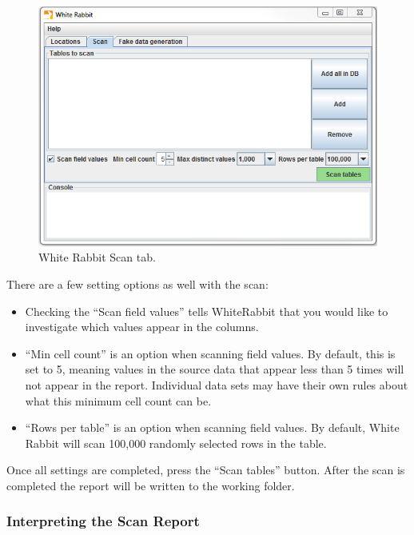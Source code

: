 \documentclass[11pt]{book}
\providecommand{\tightlist}{%
  \setlength{\itemsep}{0pt}\setlength{\parskip}{0pt}}
\theoremstyle{definition}
\theoremstyle{definition}
\theoremstyle{definition}
\theoremstyle{remark}
\begin{document}
\begin{figure}
\includegraphics[width=1\linewidth]{images/ExtractTransformLoad/WhiteRabbitAddTables} \caption{White Rabbit Scan tab.}\label{fig:WhiteRabbitAddTables}
\end{figure}

There are a few setting options as well with the scan:

\begin{itemize}
\tightlist
\item
  Checking the ``Scan field values'' tells WhiteRabbit that you would like to investigate which values appear in the columns.
\item
  ``Min cell count'' is an option when scanning field values. By default, this is set to 5, meaning values in the source data that appear less than 5 times will not appear in the report. Individual data sets may have their own rules about what this minimum cell count can be.
\item
  ``Rows per table'' is an option when scanning field values. By default, White Rabbit will scan 100,000 randomly selected rows in the table.
\end{itemize}

Once all settings are completed, press the ``Scan tables'' button. After the scan is completed the report will be written to the working folder.

\hypertarget{interpreting-the-scan-report}{%
\subsubsection*{Interpreting the Scan Report}\label{interpreting-the-scan-report}}
\end{document}
